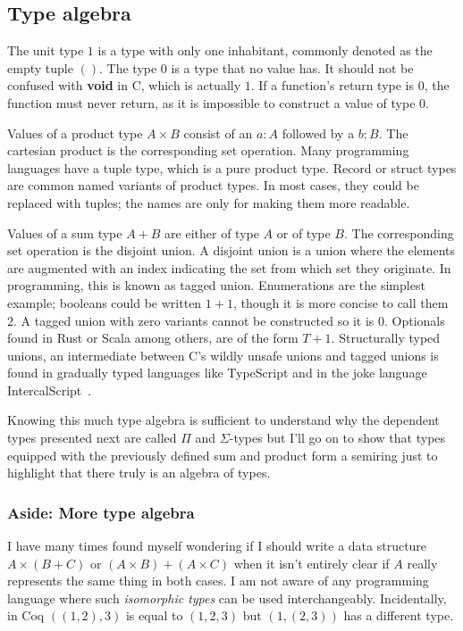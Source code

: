 \documentclass[english, 12pt, a4paper, sci, a-1b, online]{aaltothesis}
\begin{document}
\subsection{Type algebra}

The unit type $1$ is a type with only one inhabitant, commonly denoted as the empty tuple $()$. The type $0$ is a type that no value has. It should not be confused with \textbf{void} in C, which is actually $1$. If a function's return type is $0$, the function must never return, as it is impossible to construct a value of type $0$.

Values of a product type $A \times B$ consist of an $a : A$ followed by a $b : B$. The cartesian product is the corresponding set operation. Many programming languages have a tuple type, which is a pure product type. Record or struct types are common named variants of product types. In most cases, they could be replaced with tuples; the names are only for making them more readable.

Values of a sum type $A + B$ are either of type $A$ or of type $B$. The corresponding set operation is the disjoint union. A disjoint union is a union where the elements are augmented with an index indicating the set from which set they originate. In programming, this is known as tagged union. Enumerations are the simplest example; booleans could be written $1 + 1$, though it is more concise to call them $2$. A tagged union with zero variants cannot be constructed so it is $0$. Optionals found in Rust or Scala among others, are of the form $T + 1$. Structurally typed unions, an intermediate between C's wildly unsafe unions and tagged unions is found in gradually typed languages like TypeScript and in the joke language IntercalScript~\cite{ICS}.

Knowing this much type algebra is sufficient to understand why the dependent types presented next are called $\Pi$ and $\Sigma$-types but I'll go on to show that types equipped with the previously defined sum and product form a semiring just to highlight that there truly is an algebra of types.

\subsubsection{Aside: More type algebra}

I have many times found myself wondering if I should write a data structure $A \times (B + C)$ or $(A \times B) + (A \times C)$ when it isn't entirely clear if $A$ really represents the same thing in both cases. I am not aware of any programming language where such \emph{isomorphic types} can be used interchangeably. Incidentally, in Coq $((1, 2), 3)$ is equal to $(1, 2, 3)$ but $(1, (2, 3))$ has a different type.
\end{document}
